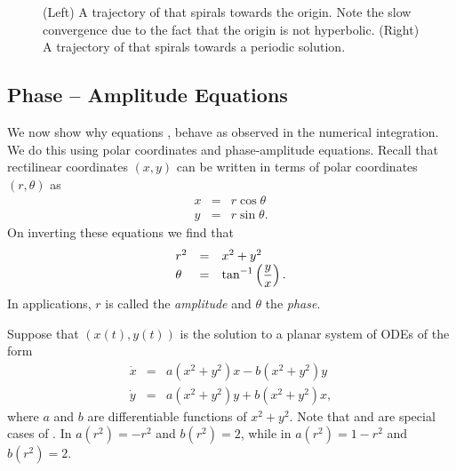 \documentclass{ximera}
\begin{document}
\begin{figure}[htb]
           \centerline{%
	   }
           \caption{(Left) A trajectory of \protect{}
that spirals towards the origin. Note the slow convergence due to the fact 
that the origin is not hyperbolic.  (Right) A trajectory of 
\protect{} that spirals towards a periodic solution.}
           \label{F:nonlincenter}
\end{figure}

\subsection*{Phase -- Amplitude Equations}

We now show why equations , 
behave as observed in the numerical integration.  We do this using 
polar coordinates and phase-amplitude equations.  
Recall that rectilinear coordinates $(x,y)$ can be written in terms 
of polar coordinates $(r,\theta)$ as
\begin{eqnarray*}
x & = & r\cos\theta\\
y & = & r\sin\theta.
\end{eqnarray*}
On inverting these equations we find that
\arraystart
\begin{equation} \label{e:polarccord}
\begin{array}{lcl}
r^2 & = & x^2+y^2  \\
\theta & = & \displaystyle\tan^{-1}\left(\frac{y}{x}\right). 
\end{array}
\end{equation}
\arrayfinish
In applications, $r$ is called the {\em amplitude\/} and 
$\theta$ the {\em phase\/}.

Suppose that $(x(t),y(t))$ is the solution to a planar system of
ODEs of the form 
\begin{equation} \label{e:HopfNF}
\begin{array}{rcl}
\dot{x} & = & a(x^2+y^2)x - b(x^2+y^2)y\\
\dot{y} & = & a(x^2+y^2)y + b(x^2+y^2)x,
\end{array}
\end{equation}
where $a$ and $b$ are differentiable functions of $x^2+y^2$.
Note that  and  are special cases 
of .  In  $a(r^2)=-r^2$ and $b(r^2)=2$, 
while in  $a(r^2)=1-r^2$ and $b(r^2)=2$.
\end{document}

